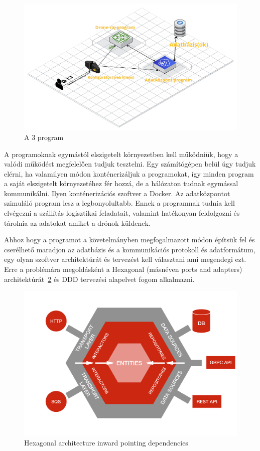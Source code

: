 \begin{figure}[h]
    \centering
    \includegraphics[scale=0.22]{images/szakdolgozat-3-program-abra.png}
    \caption{A 3 program}
    \label{fig:3program}
\end{figure}
A programoknak egymástól elszigetelt környezetben kell működniük, hogy a valódi működést megfelelően tudjuk tesztelni.
Egy számítógépen belül úgy tudjuk elérni, ha valamilyen módon konténerizáljuk a programokat, így minden program a saját elszigetelt környezetéhez fér hozzá, de a hálózaton tudnak egymással kommunikálni.
Ilyen konténerizációs szoftver a Docker.
Az adatközpontot szimuláló program lesz a legbonyolultabb.
Ennek a programnak tudnia kell elvégezni a szállítás logisztikai feladatait, valamint hatékonyan feldolgozni és tárolnia az adatokat amiket a drónok küldenek.


Ahhoz hogy a programot a követelmányben megfogalmazott módon építsük fel és cserélhető maradjon az adatbázis és a kommunikációs protokoll és adatformátum, egy olyan szoftver architektúrát és tervezést kell választani ami megendegi ezt.
Erre a problémára megoldásként a Hexagonal (másnéven ports and adapters) architektúrát~\ref{fig:hexagonal-inward} és DDD tervezési alapelvet fogom alkalmazni.
\begin{figure}[h]
    \centering
    \includegraphics[scale=0.07]{images/hexa-inward.png}
    \caption{Hexagonal architecture inward pointing dependencies}
    \label{fig:hexagonal-inward}
\end{figure}


